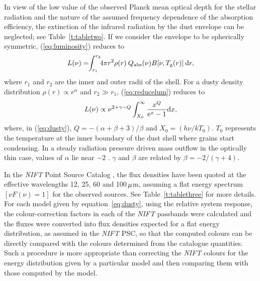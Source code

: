 \documentclass[useAMS,usenatbib]{biom}
\begin{document}
In view of the low value of the observed Planck mean  optical depth for
the stellar radiation and the nature of the assumed frequency
dependence of the absorption efficiency, the extinction of the infrared
radiation by the dust envelope can be neglected; see Table~\ref{t:tabletwo}. If we consider the
envelope to be spherically symmetric, (\ref{eq:luminosity}) reduces to
\begin{equation}
   L(\nu)=\!\!\int_{r_{1}}^{r_{2}}\!\!4\upi r^2\rho(r)\> Q_{\rmn{abs}}(\nu)B[\nu,T_{\rmn{g}}(r)]\> {\rmn{d}}r,
\label{eq:reducelum}
\end{equation}
where $r_1$ and $r_2$ are the inner and
outer radii of the shell. For a dusty density distribution
$\rho(r)\propto r^{\alpha}$ and $r_2\gg r_1$, (\ref{eq:reducelum}) reduces to
\begin{equation}
   L(\nu)\propto \nu^{2+\gamma-Q}\int_{X_0}^{\infty}{{x^Q}\over
   {\rmn{e}^x-1}}\rmn{d}x ,
\label{eq:dusty}
\end{equation}
where, in (\ref{eq:dusty}), $Q=-(\alpha+\beta+3)/\beta$ and $X_0=(h\nu
/kT_0)$. $T_0$ represents the temperature at the inner boundary of the
dust shell where grains start condensing. In a steady radiation
pressure driven mass outflow in the optically thin case, values of
$\alpha$ lie near $-2$ \citep{b8}. $\gamma$ and $\beta$ are related by
$\beta=-2/(\gamma+4)$.


In the {\it NIFT\/} Point Source Catalog \citep[PSC;][]{b2}, the flux
densities have been quoted at the effective wavelengths 12, 25, 60 and
\hbox{100\,$\mu$m}, assuming a flat energy spectrum $[\nu F(\nu)=1]$
for the observed sources. See Table~\ref{t:tablethree} for more
details. For each model given by equation~\ref{eq:dusty}, using the relative
system response, the colour-correction factors in each of the {\it
NIFT\/} passbands were calculated and the fluxes were converted into
flux densities expected for a flat energy distribution, as assumed in
the {\it NIFT\/} PSC, so that the computed colours can be directly
compared with the colours determined from the catalogue
quantities. Such a procedure is more appropriate than correcting the
{\it NIFT\/} colours for the energy distribution given by a particular
model and then comparing them with those computed by the model.\vspace*{-6pt}
\end{document}
